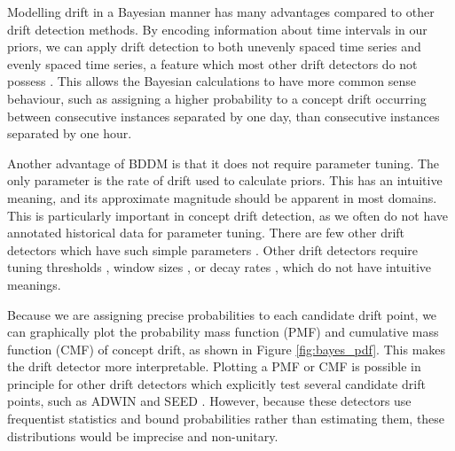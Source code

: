 Modelling drift in a Bayesian manner has many advantages compared to other drift detection methods. By encoding information about time intervals in our priors, we can apply drift detection to both unevenly spaced time series and evenly spaced time series, a feature which most other drift detectors do not possess \cite{sedanspot}. This allows the Bayesian calculations to have more common sense behaviour, such as assigning a higher probability to a concept drift occurring between consecutive instances separated by one day, than consecutive instances separated by one hour.

Another advantage of BDDM is that it does not require parameter tuning. The only parameter is the rate of drift used to calculate priors. This has an intuitive meaning, and its approximate magnitude should be apparent in most domains. This is particularly important in concept drift detection, as we often do not have annotated historical data for parameter tuning. There are few other drift detectors which have such simple parameters \cite{DDM}\cite{CUSUM}. Other drift detectors require tuning thresholds \cite{ADWIN}\cite{HDDM}, window sizes \cite{STEPD}\cite{PL}, or decay rates \cite{HDDM}\cite{EWMA}, which do not have intuitive meanings. %

Because we are assigning precise probabilities to each candidate drift point, we can graphically plot the probability mass function (PMF) and cumulative mass function (CMF) of concept drift, as shown in Figure \ref{fig:bayes_pdf}. This makes the drift detector more interpretable. Plotting a PMF or CMF is possible in principle for other drift detectors which explicitly test several candidate drift points, such as ADWIN \cite{ADWIN} and SEED \cite{SEED}. However, because these detectors use frequentist statistics and bound probabilities rather than estimating them, these distributions would be imprecise and non-unitary.

